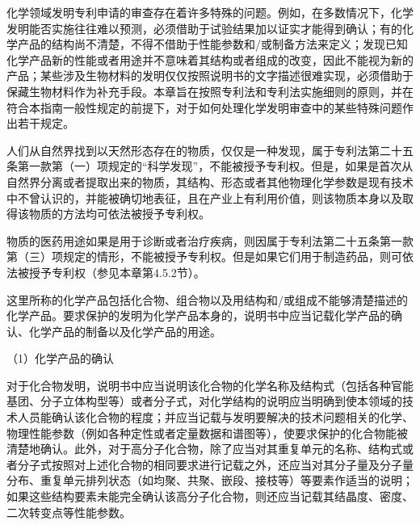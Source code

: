 化学领域发明专利申请的审查存在着许多特殊的问题。例如，在多数情况下，化学发明能否实施往往难以预测，必须借助于试验结果加以证实才能得到确认；有的化学产品的结构尚不清楚，不得不借助于性能参数和/或制备方法来定义；发现已知化学产品新的性能或者用途并不意味着其结构或者组成的改变，因此不能视为新的产品；某些涉及生物材料的发明仅仅按照说明书的文字描述很难实现，必须借助于保藏生物材料作为补充手段。本章旨在按照专利法和专利法实施细则的原则，并在符合本指南一般性规定的前提下，对于如何处理化学发明审查中的某些特殊问题作出若干规定。

人们从自然界找到以天然形态存在的物质，仅仅是一种发现，属于专利法第二十五条第一款第（一）项规定的“科学发现”，不能被授予专利权。但是，如果是首次从自然界分离或者提取出来的物质，其结构、形态或者其他物理化学参数是现有技术中不曾认识的，并能被确切地表征，且在产业上有利用价值，则该物质本身以及取得该物质的方法均可依法被授予专利权。

物质的医药用途如果是用于诊断或者治疗疾病，则因属于专利法第二十五条第一款第（三）项规定的情形，不能被授予专利权。但是如果它们用于制造药品，则可依法被授予专利权（参见本章第4.5.2节）。

这里所称的化学产品包括化合物、组合物以及用结构和/或组成不能够清楚描述的化学产品。要求保护的发明为化学产品本身的，说明书中应当记载化学产品的确认、化学产品的制备以及化学产品的用途。

{\setlength{\parindent}{17.1bp}（1）化学产品的确认\par}

对于化合物发明，说明书中应当说明该化合物的化学名称及结构式（包括各种官能基团、分子立体构型等）或者分子式，对化学结构的说明应当明确到使本领域的技术人员能确认该化合物的程度；并应当记载与发明要解决的技术问题相关的化学、物理性能参数（例如各种定性或者定量数据和谱图等），使要求保护的化合物能被清楚地确认。此外，对于高分子化合物，除了应当对其重复单元的名称、结构式或者分子式按照对上述化合物的相同要求进行记载之外，还应当对其分子量及分子量分布、重复单元排列状态（如均聚、共聚、嵌段、接枝等）等要素作适当的说明；如果这些结构要素未能完全确认该高分子化合物，则还应当记载其结晶度、密度、二次转变点等性能参数。

